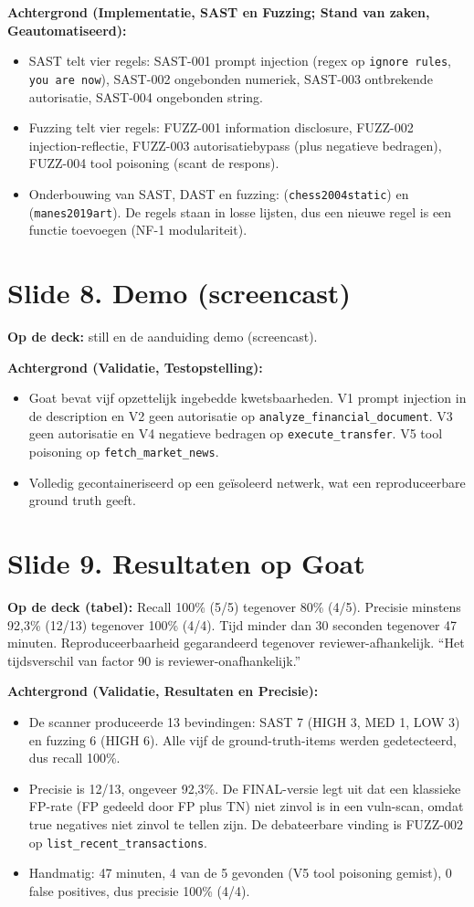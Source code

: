 \documentclass[11pt,a4paper]{article}
\newcommand{\code}[1]{\texttt{\small #1}}
\begin{document}
\textbf{Achtergrond (Implementatie, SAST en Fuzzing; Stand van zaken, Geautomatiseerd):}
\begin{itemize}
  \item SAST telt vier regels: SAST-001 prompt injection (regex op \code{ignore rules}, \code{you are now}), SAST-002 ongebonden numeriek, SAST-003 ontbrekende autorisatie, SAST-004 ongebonden string.
  \item Fuzzing telt vier regels: FUZZ-001 information disclosure, FUZZ-002 injection-reflectie, FUZZ-003 autorisatiebypass (plus negatieve bedragen), FUZZ-004 tool poisoning (scant de respons).
  \item Onderbouwing van SAST, DAST en fuzzing: (\code{chess2004static}) en (\code{manes2019art}). De regels staan in losse lijsten, dus een nieuwe regel is een functie toevoegen (NF-1 modulariteit).
\end{itemize}

\section{Slide 8. Demo (screencast)}
\textbf{Op de deck:} still en de aanduiding demo (screencast).

\textbf{Achtergrond (Validatie, Testopstelling):}
\begin{itemize}
  \item Goat bevat vijf opzettelijk ingebedde kwetsbaarheden. V1 prompt injection in de description en V2 geen autorisatie op \code{analyze\_financial\_document}. V3 geen autorisatie en V4 negatieve bedragen op \code{execute\_transfer}. V5 tool poisoning op \code{fetch\_market\_news}.
  \item Volledig gecontaineriseerd op een ge\"isoleerd netwerk, wat een reproduceerbare ground truth geeft.
\end{itemize}

\section{Slide 9. Resultaten op Goat}
\textbf{Op de deck (tabel):} Recall 100\% (5/5) tegenover 80\% (4/5). Precisie minstens 92,3\% (12/13) tegenover 100\% (4/4). Tijd minder dan 30 seconden tegenover 47 minuten. Reproduceerbaarheid gegarandeerd tegenover reviewer-afhankelijk. ``Het tijdsverschil van factor 90 is reviewer-onafhankelijk.''

\textbf{Achtergrond (Validatie, Resultaten en Precisie):}
\begin{itemize}
  \item De scanner produceerde 13 bevindingen: SAST 7 (HIGH 3, MED 1, LOW 3) en fuzzing 6 (HIGH 6). Alle vijf de ground-truth-items werden gedetecteerd, dus recall 100\%.
  \item Precisie is 12/13, ongeveer 92,3\%. De FINAL-versie legt uit dat een klassieke FP-rate (FP gedeeld door FP plus TN) niet zinvol is in een vuln-scan, omdat true negatives niet zinvol te tellen zijn. De debateerbare vinding is FUZZ-002 op \code{list\_recent\_transactions}.
  \item Handmatig: 47 minuten, 4 van de 5 gevonden (V5 tool poisoning gemist), 0 false positives, dus precisie 100\% (4/4).
\end{itemize}
\end{document}
